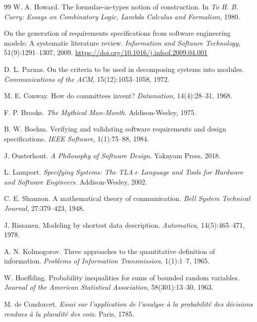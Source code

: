 \begin{thebibliography}{99}
W. A. Howard.
\newblock The formulae-as-types notion of construction.
\newblock In \emph{To H. B. Curry: Essays on Combinatory Logic, Lambda Calculus and
Formalism}, 1980.

On the generation of requirements specifications from software engineering models:
A systematic literature review.
\newblock \emph{Information and Software Technology}, 51(9):1291--1307, 2009.
\newblock \url{https://doi.org/10.1016/j.infsof.2009.04.001}


D. L. Parnas.
\newblock On the criteria to be used in decomposing systems into modules.
\newblock \emph{Communications of the ACM}, 15(12):1053--1058, 1972.

M. E. Conway.
\newblock How do committees invent?
\newblock \emph{Datamation}, 14(4):28--31, 1968.

F. P. Brooks.
\newblock \emph{The Mythical Man-Month}.
\newblock Addison-Wesley, 1975.

B. W. Boehm.
\newblock Verifying and validating software requirements and design specifications.
\newblock \emph{IEEE Software}, 1(1):75--88, 1984.

J. Ousterhout.
\newblock \emph{A Philosophy of Software Design}.
\newblock Yaknyam Press, 2018.

L. Lamport.
\newblock \emph{Specifying Systems: The TLA+ Language and Tools for Hardware and
Software Engineers}.
\newblock Addison-Wesley, 2002.

C. E. Shannon.
\newblock A mathematical theory of communication.
\newblock \emph{Bell System Technical Journal}, 27:379--423, 1948.

J. Rissanen.
\newblock Modeling by shortest data description.
\newblock \emph{Automatica}, 14(5):465--471, 1978.

A. N. Kolmogorov.
\newblock Three approaches to the quantitative definition of information.
\newblock \emph{Problems of Information Transmission}, 1(1):1--7, 1965.

W. Hoeffding.
\newblock Probability inequalities for sums of bounded random variables.
\newblock \emph{Journal of the American Statistical Association}, 58(301):13--30,
1963.

M. de Condorcet.
\newblock \emph{Essai sur l'application de l'analyse \`a la probabilit\'e des
d\'ecisions rendues \`a la pluralit\'e des voix}.
\newblock Paris, 1785.


\end{thebibliography}
